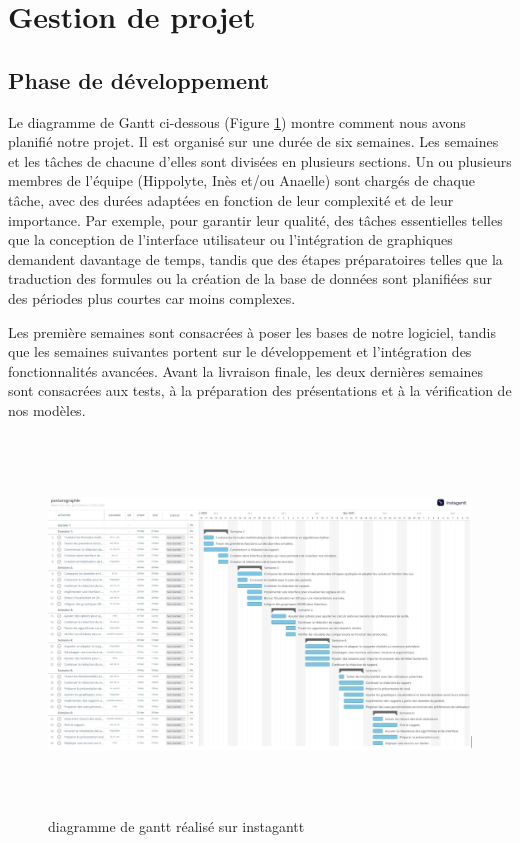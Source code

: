 \section{Gestion de projet}

\subsection{Phase de développement}

Le diagramme de Gantt ci-dessous (Figure \ref{fig:Gantt}) montre comment nous avons planifié 
notre projet. Il est organisé sur une durée de six semaines. 
Les semaines et les tâches de chacune d'elles sont divisées en plusieurs sections. 
Un ou plusieurs membres de l'équipe (Hippolyte, Inès et/ou Anaelle) sont chargés 
de chaque tâche, avec des durées adaptées en fonction de leur complexité et de 
leur importance. Par exemple, pour garantir leur qualité, des tâches essentielles 
telles que la conception de l'interface utilisateur ou l'intégration de graphiques 
demandent davantage de temps, tandis que des étapes préparatoires telles que la 
traduction des formules ou la création de la base de données sont planifiées sur 
des périodes plus courtes car moins complexes.

Les première semaines sont consacrées à poser les bases de notre logiciel, 
tandis que les semaines suivantes portent sur le développement et l'intégration 
des fonctionnalités avancées. Avant la livraison finale, les deux dernières 
semaines sont consacrées aux tests, à la préparation des présentations et à la 
vérification de nos modèles.

\begin{figure}[H]
    \centering
      \includegraphics[height=10cm]{images/Gantt.png}
      \caption{diagramme de gantt réalisé sur instagantt}\label{fig:Gantt}
\end{figure}

